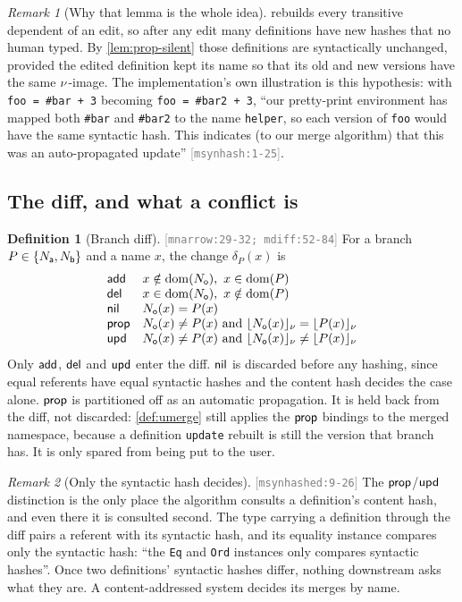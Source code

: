 \documentclass[11pt]{article}
\theoremstyle{definition}
\newtheorem{definition}{Definition}[section]
\theoremstyle{plain}
\theoremstyle{remark}
\newtheorem{remark}{Remark}[section]
\newcommand{\src}[1]{{\footnotesize\textcolor{gray}{[\texttt{#1}]}}}
\begin{document}
\begin{remark}[Why that lemma is the whole idea]\label{rem:prop-silent}
 rebuilds every transitive dependent of an edit, so after any edit many definitions
have new hashes that no human typed. By \cref{lem:prop-silent} those definitions are syntactically
unchanged, provided the edited definition kept its name so that its old and new versions have the
same $\nu$-image. The implementation's own illustration is this hypothesis: with
\texttt{foo = \#bar + 3} becoming \texttt{foo = \#bar2 + 3}, ``our pretty-print environment has mapped
both \texttt{\#bar} and \texttt{\#bar2} to the name \texttt{helper}, so each version of \texttt{foo}
would have the same syntactic hash. This indicates (to our merge algorithm) that this was an
auto-propagated update'' \src{msynhash:1-25}.
\end{remark}

\subsection{The diff, and what a conflict is}

\begin{definition}[Branch diff]\label{def:mergediff}
\src{mnarrow:29-32; mdiff:52-84} For a branch $P \in \{N_{\mathsf{a}}, N_{\mathsf{b}}\}$ and a name $x$, the change
$\delta_P(x)$ is
\[
\begin{array}{ll}
  \mathsf{add} & x \notin \operatorname{dom}(N_{\mathsf{o}}),\ x \in \operatorname{dom}(P) \\
  \mathsf{del} & x \in \operatorname{dom}(N_{\mathsf{o}}),\ x \notin \operatorname{dom}(P) \\
  \mathsf{nil} & N_{\mathsf{o}}(x) = P(x) \\
  \mathsf{prop} & N_{\mathsf{o}}(x) \neq P(x) \text{ and } \lfloor N_{\mathsf{o}}(x) \rfloor_{\nu} = \lfloor P(x) \rfloor_{\nu} \\
  \mathsf{upd} & N_{\mathsf{o}}(x) \neq P(x) \text{ and } \lfloor N_{\mathsf{o}}(x) \rfloor_{\nu} \neq \lfloor P(x) \rfloor_{\nu}
\end{array}
\]
Only $\mathsf{add}$, $\mathsf{del}$ and $\mathsf{upd}$ enter the diff. $\mathsf{nil}$ is discarded before any hashing, since
equal referents have equal syntactic hashes and the content hash decides the case alone. $\mathsf{prop}$ is
partitioned off as an automatic propagation. It is held back from the diff, not discarded:
\cref{def:umerge} still applies the $\mathsf{prop}$ bindings to the merged namespace, because a definition
\texttt{update} rebuilt is still the version that branch has. It is only spared from being put to
the user.
\end{definition}

\begin{remark}[Only the syntactic hash decides]\label{rem:syn-only}
\src{msynhashed:9-26} The $\mathsf{prop}$/$\mathsf{upd}$ distinction is the only place the algorithm consults a
definition's content hash, and even there it is consulted second. The type carrying a definition
through the diff pairs a referent with its syntactic hash, and its equality instance compares only the
syntactic hash: ``the \texttt{Eq} and \texttt{Ord} instances only compares syntactic hashes''. Once
two definitions' syntactic hashes differ, nothing downstream asks what they are. A content-addressed
system decides its merges by name.
\end{remark}
\end{document}

